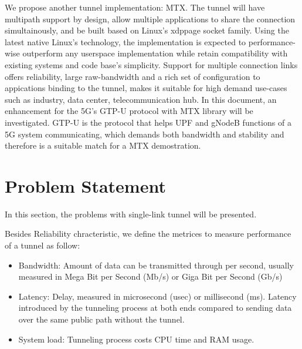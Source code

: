 We propose another tunnel implementation: \ac{MTX}. 
The tunnel will have multipath support by design, allow multiple applications to share the connection simultainously, and be built based on Linux's \ac{xdppage} socket family.
Using the latest native Linux's technology, the implementation is expected to performance-wise outperform any userspace implementation while retain compatibility with existing systems and code base's simplicity. 
Support for multiple connection links offers reliability, large raw-bandwidth and a rich set of configuration to appications binding to the tunnel, makes it suitable for high demand use-cases such as industry, data center, telecommunication hub. 
In this document, an enhancement for the 5G's GTP-U protocol with \ac{MTX} library will be investigated. GTP-U is the protocol that helps UPF and gNodeB functions of a 5G system communicating, which demands both bandwidth and stability and therefore is a suitable match for a \ac{MTX} demostration.


\section{Problem Statement}
In this section, the problems with single-link tunnel will be presented.

Besides Reliability chracteristic, we define the metrices to measure performance of a tunnel as follow:

\begin{itemize}
    \item Bandwidth: Amount of data can be transmitted through per second, usually measured in Mega Bit per Second (Mb/s) or Giga Bit per Second (Gb/s)
    \item Latency: Delay, measured in microsecond (usec) or millisecond (ms). Latency introduced by the tunneling process at both ends compared to sending data over the same public path without the tunnel.
    \item System load: Tunneling process costs CPU time and RAM usage.
\end{itemize}

